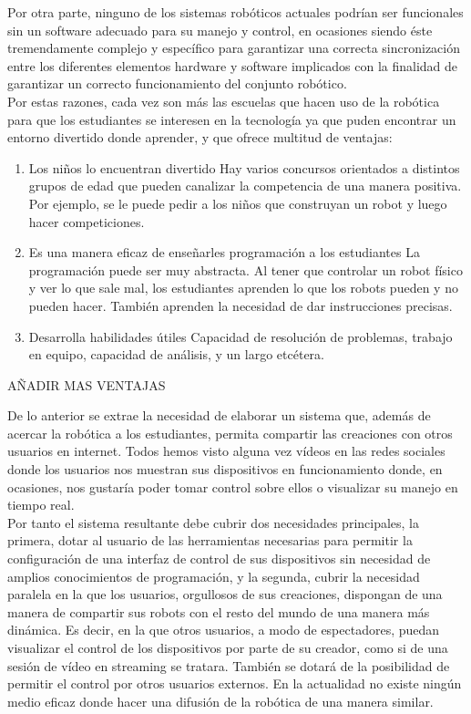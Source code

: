 Por otra parte, ninguno de los sistemas robóticos actuales podrían ser funcionales sin un software adecuado para su manejo y control, en ocasiones siendo éste tremendamente complejo y específico para garantizar una correcta sincronización entre los diferentes elementos hardware y software implicados con la finalidad de garantizar un correcto funcionamiento del conjunto robótico.\\

Por estas razones, cada vez son más las escuelas que hacen uso de la robótica para que los estudiantes se interesen en la tecnología ya que puden encontrar un entorno divertido donde aprender, y que ofrece multitud de ventajas: 

\begin{enumerate}
\item {Los niños lo encuentran divertido}
Hay varios concursos orientados a distintos grupos de edad que pueden canalizar la competencia de una manera positiva. Por ejemplo, se le puede pedir a los niños que construyan un robot y luego hacer competiciones.\\
\item{Es una manera eficaz de enseñarles programación a los estudiantes}
La programación puede ser muy abstracta. Al tener que controlar un robot físico y ver lo que sale mal, los estudiantes aprenden lo que los robots pueden y no pueden hacer. También aprenden la necesidad de dar instrucciones precisas.\\
\item{ Desarrolla habilidades útiles}
Capacidad de resolución de problemas, trabajo en equipo, capacidad de análisis, y un largo etcétera.
\end{enumerate}

AÑADIR MAS VENTAJAS


De lo anterior se extrae la necesidad de elaborar un sistema que, además de acercar la robótica a los estudiantes, permita compartir las creaciones con otros usuarios en internet. Todos hemos visto alguna vez vídeos en las redes sociales donde los usuarios nos muestran sus dispositivos en funcionamiento donde, en ocasiones, nos gustaría poder tomar control sobre ellos o visualizar su manejo en tiempo real.\\

Por tanto el sistema resultante debe cubrir dos necesidades principales, la primera, dotar al usuario de las herramientas necesarias para permitir la configuración de una interfaz de control de sus dispositivos sin necesidad de amplios conocimientos de programación, y la segunda, cubrir la necesidad paralela en la que los usuarios, orgullosos de sus creaciones, dispongan de una manera de compartir sus robots con el resto del mundo de una manera más dinámica. Es decir, en la que otros usuarios, a modo de espectadores, puedan visualizar el control de los dispositivos por parte de su creador, como si de una sesión de vídeo en streaming se tratara. También se dotará de la posibilidad de permitir el control por otros usuarios externos. En la actualidad no existe ningún medio eficaz donde hacer una difusión de la robótica de una manera similar.\\

